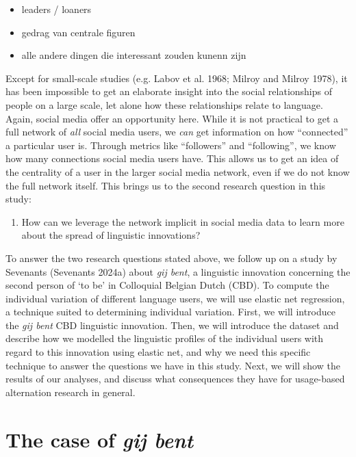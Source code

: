 \documentclass[
  letterpaper,
  DIV=11,
  numbers=noendperiod,
  oneside]{scrartcl}
\providecommand{\tightlist}{%
  \setlength{\itemsep}{0pt}\setlength{\parskip}{0pt}}\usepackage{longtable,booktabs,array}
\begin{document}
\begin{itemize}
\tightlist
\item
  leaders / loaners
\item
  gedrag van centrale figuren
\item
  alle andere dingen die interessant zouden kunenn zijn
\end{itemize}

Except for small-scale studies (e.g. Labov et al. 1968; Milroy and
Milroy 1978), it has been impossible to get an elaborate insight into
the social relationships of people on a large scale, let alone how these
relationships relate to language. Again, social media offer an
opportunity here. While it is not practical to get a full network of
\emph{all} social media users, we \emph{can} get information on how
``connected'' a particular user is. Through metrics like ``followers''
and ``following'', we know how many connections social media users have.
This allows us to get an idea of the centrality of a user in the larger
social media network, even if we do not know the full network itself.
This brings us to the second research question in this study:

\begin{enumerate}
\def\labelenumi{\arabic{enumi}.}
\setcounter{enumi}{1}
\tightlist
\item
  How can we leverage the network implicit in social media data to learn
  more about the spread of linguistic innovations?
\end{enumerate}

To answer the two research questions stated above, we follow up on a
study by Sevenants (Sevenants 2024a) about \emph{gij bent}, a linguistic
innovation concerning the second person of `to be' in Colloquial Belgian
Dutch (CBD). To compute the individual variation of different language
users, we will use elastic net regression, a technique suited to
determining individual variation. First, we will introduce the \emph{gij
bent} CBD linguistic innovation. Then, we will introduce the dataset and
describe how we modelled the linguistic profiles of the individual users
with regard to this innovation using elastic net, and why we need this
specific technique to answer the questions we have in this study. Next,
we will show the results of our analyses, and discuss what consequences
they have for usage-based alternation research in general.

\section{\texorpdfstring{The case of \emph{gij
bent}}{The case of gij bent}}\label{the-case-of-gij-bent}
\end{document}
